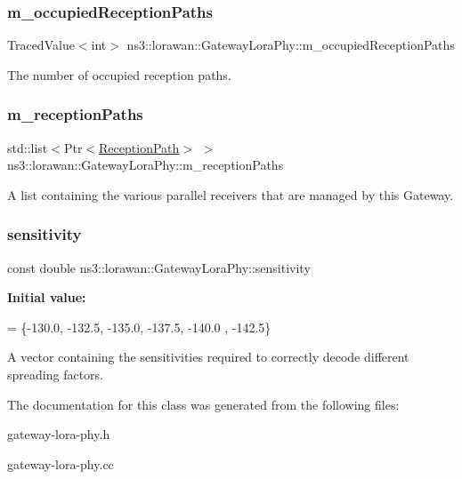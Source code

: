 \subsubsection{\texorpdfstring{m\+\_\+occupied\+Reception\+Paths}{m\_occupiedReceptionPaths}}
{\footnotesize\ttfamily Traced\+Value$<$int$>$ ns3\+::lorawan\+::\+Gateway\+Lora\+Phy\+::m\+\_\+occupied\+Reception\+Paths\hspace{0.3cm}{\ttfamily [protected]}}

The number of occupied reception paths. \mbox{\label{classns3_1_1lorawan_1_1GatewayLoraPhy_ad76f73bdb7fe35f39eaf75cf619445fc}} 
\subsubsection{\texorpdfstring{m\+\_\+reception\+Paths}{m\_receptionPaths}}
{\footnotesize\ttfamily std\+::list$<$Ptr$<$\hyperlink{classns3_1_1lorawan_1_1GatewayLoraPhy_1_1ReceptionPath}{Reception\+Path}$>$ $>$ ns3\+::lorawan\+::\+Gateway\+Lora\+Phy\+::m\+\_\+reception\+Paths\hspace{0.3cm}{\ttfamily [protected]}}

A list containing the various parallel receivers that are managed by this Gateway. \mbox{\label{classns3_1_1lorawan_1_1GatewayLoraPhy_a5e087b8d88cf37e3c81d189876cb3b67}} 
\subsubsection{\texorpdfstring{sensitivity}{sensitivity}}
{\footnotesize\ttfamily const double ns3\+::lorawan\+::\+Gateway\+Lora\+Phy\+::sensitivity\hspace{0.3cm}{\ttfamily [static]}}

{\bfseries Initial value\+:}
\begin{DoxyCode}
= \{-130.0, -132.5, -135.0,
                                                                                             -137.5, -140.0
      , -142.5\}
\end{DoxyCode}
A vector containing the sensitivities required to correctly decode different spreading factors. 

The documentation for this class was generated from the following files\+:\begin{DoxyCompactItemize}
\item 
gateway-\/lora-\/phy.\+h\item 
gateway-\/lora-\/phy.\+cc\end{DoxyCompactItemize}
